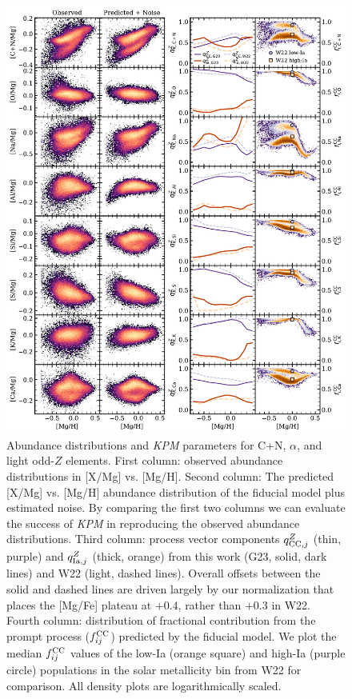 \documentclass[modern]{aastex631}
\newcommand{\qcc}{q_{{\rm CC,}j}^{Z}}
\newcommand{\qIa}{q_{{\rm Ia,}j}^{Z}}
\newcommand{\fcc}{f_{ij}^{\rm CC}}
\newcommand{\name}{\textsl{KPM}}
\begin{document}
\begin{figure}[htb!]
    \centering
    \includegraphics[width=\textwidth]{Paper/Figures/all_param1.pdf}
    \caption{Abundance distributions and \name{} parameters for C+N, $\alpha$, and light odd-$Z$ elements. First column: observed abundance distributions in [X/Mg] vs. [Mg/H]. Second column: The predicted [X/Mg] vs. [Mg/H] abundance distribution of the fiducial model plus estimated noise. By comparing the first two columns we can evaluate the success of \name{} in reproducing the observed abundance distributions. Third column: process vector components $\qcc$ (thin, purple) and $\qIa$ (thick, orange) from this work (G23, solid, dark lines) and W22 (light, dashed lines). Overall offsets between the solid and dashed lines are driven largely by our normalization that places the [Mg/Fe] plateau at $+0.4$, rather than $+0.3$ in W22. Fourth column: distribution of fractional contribution from the prompt process ($\fcc$) predicted by the fiducial model. We plot the median $\fcc$ values of the low-Ia (orange square) and high-Ia (purple circle) populations in the solar metallicity bin from W22 for comparison. All density plots are logarithmically scaled.}
    \label{fig:all_param1}
\end{figure}
\end{document}
